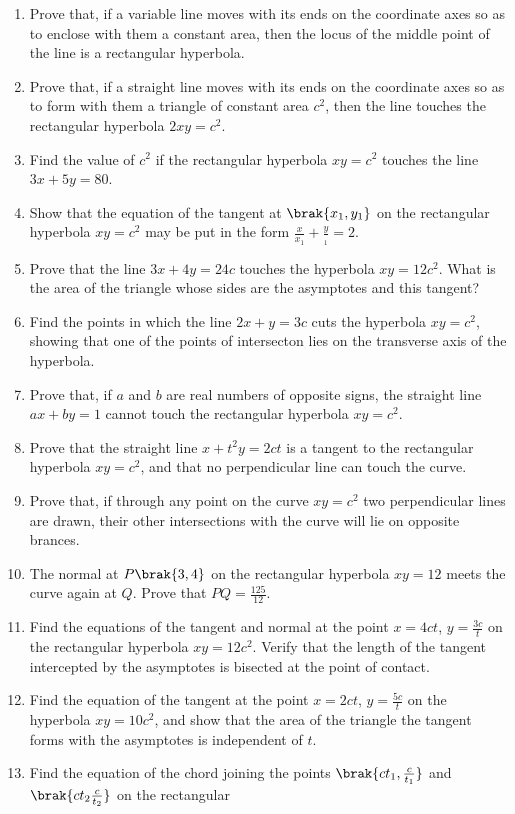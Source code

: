 \begin{enumerate}[1.]
\item Prove that, if a variable line moves with its ends on the coordinate axes so as
to enclose with them a constant area, then the locus of the middle point of the line
is a rectangular hyperbola.
\item Prove that, if a straight line moves with its ends on the coordinate axes so as
to form with them a triangle of constant area $c^2$, then the line touches the rectangular
hyperbola $2xy=c^2$.
\item Find the value of $c^2$ if the rectangular hyperbola $xy=c^2$ touches the line $3x+5y=80$.
\item Show that the equation of the tangent at $\brak{x_1,y_1}$  on the rectangular hyperbola
$xy=c^2$ may be put in the form $\frac{x}{x_1}+\frac{y}{_1} = 2$.
\item Prove that the line $3x+4y=24c$ touches the hyperbola $xy=12c^2$.  What is the area of the 
triangle whose sides are the asymptotes and this tangent?
\item Find the points in which the line $2x+y=3c$ cuts the hyperbola $xy=c^2$, showing that
one of the points of intersecton lies on the transverse axis of the hyperbola.
\item Prove that, if $a$ and $b$ are real numbers of opposite signs, the straight line
$ax+by=1$ cannot touch the rectangular hyperbola $xy=c^2$.
\item Prove that the straight line $x+t^2y=2ct$ is a tangent to the rectangular hyperbola
$xy=c^2$, and that no perpendicular line can touch the curve.
\item Prove that, if through any point on the curve $xy=c^2$ two perpendicular lines
are drawn, their other intersections with the curve will lie on opposite
brances.
\item The normal at $P \brak{3,4}$ on the rectangular hyperbola $xy=12$ meets the curve again at $Q$.
Prove that $PQ = \frac{125}{12}$.
\item Find the equations of the tangent and normal at the point $x=4ct$, $y=\frac{3c}{t}$ on the rectangular
hyperbola $xy=12c^2$.  Verify that the length of the tangent intercepted by the asymptotes is bisected
at the point of contact.
\item Find the equation of the tangent at the point $x=2ct$, $y=\frac{5c}{t}$ on the hyperbola $xy=10c^2$, and show 
that the area of the triangle the tangent forms with the asymptotes is independent of $t$.
\item Find the equation of the chord joining the points $\brak{ct_1,\frac{c}{t_1}}$ and $\brak{ct_2\frac{c}{t_2}}$ on the rectangular 

\end{enumerate}
